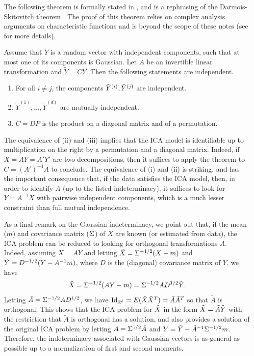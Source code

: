 The following theorem is formally stated in \citet{comon1994independent}, and is a rephrasing of the Darmois-Skitovitch theorem \citep{darmois1953analyse,skitovich1954linear}. The proof of this theorem relies on complex analysis arguments on characteristic functions and is beyond the scope of these notes (see \citet{kagan1973characterization} for more details).

\begin{theorem}
\label{th:ica.charac}
Assume that $Y$ is a random vector with independent components, such that at most one of its components is Gaussian. Let $A$ be an invertible linear transformation and $\tilde Y = CY$. Then the following statements are independent. 
\begin{enumerate}[label=(\roman*)]
\item For all $i\neq j$, the components $\tilde Y^{(i)} , \tilde Y^{(j)}$ are independent.
\item $\tilde Y^{(1)}, \ldots, \tilde Y^{(d)}$ are mutually independent. 
\item $C = DP$ is the product on a diagonal matrix and of a permutation.
\end{enumerate}
\end{theorem}

The equivalence of (ii) and (iii) implies that the ICA model is identifiable up to multiplication on the right by a permutation and a diagonal matrix. Indeed, if $X = AY = A'Y'$ are two decompositions, then it suffices to apply the theorem  to $C = (A')^{-1} A$ to conclude. The equivalence of (i) and (ii) is striking, and has the important consequence that, if the data satisfies the ICA model, then, in order to identify $A$ (up to the listed indeterminacy), it suffices to look for $Y = A^{-1}X$ with pairwise independent components, which is a much lesser constraint than full mutual independence. 

As a final remark on the Gaussian indeterminacy, we point out that, if the mean ($m$) and covariance matrix ($\Sigma$) of $X$ are known (or estimated from data), the ICA problem can be reduced to looking for orthogonal transformations $A$. Indeed, assuming $X = AY$ and letting ${\tilde{X}} = \Sigma^{-1/2} (X - m)$ and ${\tilde{Y}} = D^{-1/2}(Y - A^{-1} m)$, where $D$ is the (diagonal) covariance matrix of $Y$, we have
\[
{\tilde{X}} = \Sigma^{-1/2}(AY - m) = \Sigma^{-1/2}A D^{1/2} {\tilde{Y}}.
\]
Letting $\tilde A = \Sigma^{-1/2}A D^{1/2}$, we have $\Id_{\mR^d} = E(\tX \tX^T) = \tilde A \tilde A^T$ so that $\tilde A$ is orthogonal. This shows that  the ICA problem for ${\tilde{X}}$ in the form ${\tilde{X}} = \tilde A {\tilde{Y}}$ with the restriction that $\tilde A$ is orthogonal has a solution, and also provides a solution of the original ICA problem by letting $A = \Sigma^{1/2} \tilde A$ and $Y = {\tilde{Y}} - \tilde A^{-1} \Sigma^{-1/2} m$. Therefore, the indeterminacy associated with Gaussian vectors is as general as possible up to a normalization of first and second moments.

